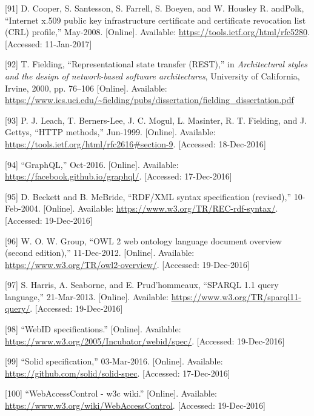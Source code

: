 \documentclass[12pt,english,a4paper,titlepage,cleardoublepage=empty,dottedtoc]{report}
\begin{document}
\hypertarget{ref-web_spec_x509}{}
{[}91{]} D. Cooper, S. Santesson, S. Farrell, S. Boeyen, and W. Housley
R. andPolk, ``Internet x.509 public key infrastructure certificate and
certificate revocation list (CRL) profile,'' May-2008. {[}Online{]}.
Available: \url{https://tools.ietf.org/html/rfc5280}. {[}Accessed:
11-Jan-2017{]}

\hypertarget{ref-web_spec_rest}{}
{[}92{]} T. Fielding, ``Representational state transfer (REST),'' in
\emph{Architectural styles and the design of network-based software
architectures}, University of California, Irvine, 2000, pp. 76--106
{[}Online{]}. Available:
\url{https://www.ics.uci.edu/~fielding/pubs/dissertation/fielding_dissertation.pdf}

\hypertarget{ref-web_spec_http-methods}{}
{[}93{]} P. J. Leach, T. Berners-Lee, J. C. Mogul, L. Masinter, R. T.
Fielding, and J. Gettys, ``HTTP methods,'' Jun-1999. {[}Online{]}.
Available: \url{https://tools.ietf.org/html/rfc2616\#section-9}.
{[}Accessed: 18-Dec-2016{]}

\hypertarget{ref-web_spec_graphql}{}
{[}94{]} ``GraphQL,'' Oct-2016. {[}Online{]}. Available:
\url{https://facebook.github.io/graphql/}. {[}Accessed: 17-Dec-2016{]}

\hypertarget{ref-web_w3c-tr_rdf}{}
{[}95{]} D. Beckett and B. McBride, ``RDF/XML syntax specification
(revised),'' 10-Feb-2004. {[}Online{]}. Available:
\url{https://www.w3.org/TR/REC-rdf-syntax/}. {[}Accessed: 19-Dec-2016{]}

\hypertarget{ref-web_w3c-tr_owl}{}
{[}96{]} W. O. W. Group, ``OWL 2 web ontology language document overview
(second edition),'' 11-Dec-2012. {[}Online{]}. Available:
\url{https://www.w3.org/TR/owl2-overview/}. {[}Accessed: 19-Dec-2016{]}

\hypertarget{ref-web_w3c-tr_sparql}{}
{[}97{]} S. Harris, A. Seaborne, and E. Prud'hommeaux, ``SPARQL 1.1
query language,'' 21-Mar-2013. {[}Online{]}. Available:
\url{https://www.w3.org/TR/sparql11-query/}. {[}Accessed: 19-Dec-2016{]}

\hypertarget{ref-web_w3c-draft_webid}{}
{[}98{]} ``WebID specifications.'' {[}Online{]}. Available:
\url{https://www.w3.org/2005/Incubator/webid/spec/}. {[}Accessed:
19-Dec-2016{]}

\hypertarget{ref-web_spec_solid}{}
{[}99{]} ``Solid specification,'' 03-Mar-2016. {[}Online{]}. Available:
\url{https://github.com/solid/solid-spec}. {[}Accessed: 17-Dec-2016{]}

\hypertarget{ref-web_2016_wiki_webaccesscontrol}{}
{[}100{]} ``WebAccessControl - w3c wiki.'' {[}Online{]}. Available:
\url{https://www.w3.org/wiki/WebAccessControl}. {[}Accessed:
19-Dec-2016{]}
\end{document}
